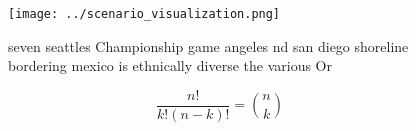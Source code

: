 \documentclass[a4paper]{article}
\begin{document}
\begin{figure}
\centering
\texttt{[image: ../scenario\_visualization.png]}
\caption{ seven seattles Championship game angeles nd san diego shoreline bordering mexico is ethnically diverse the various Or 
}
\end{figure}
 
\[ \frac{n!}{k!(n-k)!} = \binom{n}{k} \]
\end{document}
